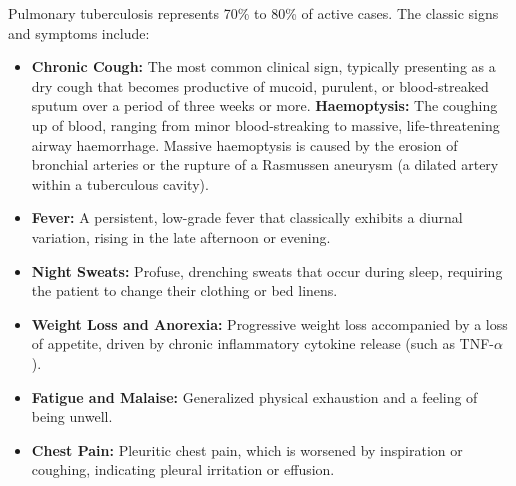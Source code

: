 Pulmonary tuberculosis represents 70\% to 80\% of active cases. The classic signs and symptoms include:
\begin{itemize}
    \item \textbf{Chronic Cough:} The most common clinical sign, typically presenting as a dry cough that becomes productive of mucoid, purulent, or blood-streaked sputum over a period of three weeks or more.
    \textbf{Haemoptysis:} The coughing up of blood, ranging from minor blood-streaking to massive, life-threatening airway haemorrhage. Massive haemoptysis is caused by the erosion of bronchial arteries or the rupture of a Rasmussen aneurysm (a dilated artery within a tuberculous cavity).
    \item \textbf{Fever:} A persistent, low-grade fever that classically exhibits a diurnal variation, rising in the late afternoon or evening.
    \item \textbf{Night Sweats:} Profuse, drenching sweats that occur during sleep, requiring the patient to change their clothing or bed linens.
    \item \textbf{Weight Loss and Anorexia:} Progressive weight loss accompanied by a loss of appetite, driven by chronic inflammatory cytokine release (such as TNF-$\alpha$).
    \item \textbf{Fatigue and Malaise:} Generalized physical exhaustion and a feeling of being unwell.
    \item \textbf{Chest Pain:} Pleuritic chest pain, which is worsened by inspiration or coughing, indicating pleural irritation or effusion.
\end{itemize}

